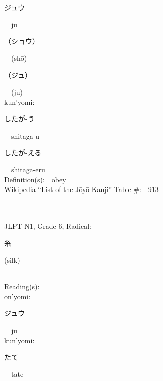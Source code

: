 \begin{multicols}{2}
{\hspace*{2em}}{\begin{CJK}{UTF8}{min} ジュウ \end{CJK}}\ \ j\=u\ \ \\
{\hspace*{2em}}{\begin{CJK}{UTF8}{min} （ショウ） \end{CJK}}\ \ (sh\=o)\ \ \\
{\hspace*{2em}}{\begin{CJK}{UTF8}{min} （ジュ） \end{CJK}}\ \ (ju)\ \ \\
{\hspace*{1em}}kun'yomi:\ \ \\
{\hspace*{2em}}{\begin{CJK}{UTF8}{min} したが-う \end{CJK}}\ \ shitaga-u\ \ \\
{\hspace*{2em}}{\begin{CJK}{UTF8}{min} したが-える \end{CJK}}\ \ shitaga-eru\ \ \\
Definition(s):\ \ obey \\
Wikipedia ``List of the J\=oy\=o Kanji'' Table \#:\ \ 913 \\
\ \ \\
{\fontsize{34pt}{40pt}  }\ \ \\  %
{JLPT N1, Grade 6, Radical:\ \ {\begin{CJK}{UTF8}{min} 糸 \end{CJK}} (silk) } \\
Reading(s):\ \ \\
{\hspace*{1em}}on'yomi:\ \ \\
{\hspace*{2em}}{\begin{CJK}{UTF8}{min} ジュウ \end{CJK}}\ \ j\=u\ \ \\
{\hspace*{1em}}kun'yomi:\ \ \\
{\hspace*{2em}}{\begin{CJK}{UTF8}{min} たて \end{CJK}}\ \ tate\ \ \\

\end{multicols}
